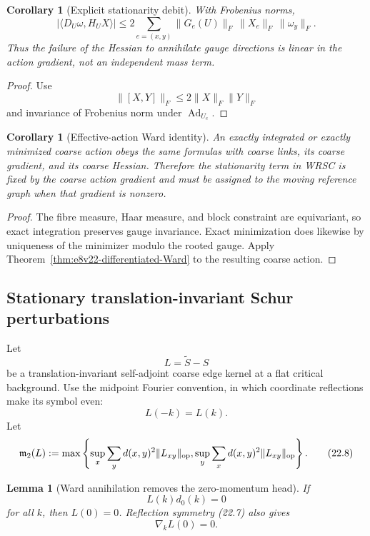 \documentclass[11pt,oneside]{book}
\newtheorem{lemma}[theorem]{Lemma}
\newtheorem{corollary}[theorem]{Corollary}
\theoremstyle{definition}
\theoremstyle{remark}
\begin{document}
\begin{corollary}[Explicit stationarity debit]
\label{cor:e8v22-stationarity}
With Frobenius norms,
\[
\left|
\langle D_U\omega,H_UX\rangle
\right|
\leq
2\sum_{e=(x,y)}
\|G_e(U)\|_F\,\|X_e\|_F\,\|\omega_y\|_F.            \tag{22.5}
\]
Thus the failure of the Hessian to annihilate gauge directions is
linear in the action gradient, not an independent mass term.
\end{corollary}

\begin{proof}
Use
\[
\|[X,Y]\|_F\leq2\|X\|_F\|Y\|_F
\]
and invariance of Frobenius norm under \(\operatorname{Ad}_{U_e}\).
\end{proof}

\begin{corollary}[Effective-action Ward identity]
\label{cor:e8v22-effective}
An exactly integrated or exactly minimized coarse action obeys the
same formulas with coarse links, its coarse gradient, and its coarse
Hessian.  Therefore the stationarity term in WRSC is fixed by the
coarse action gradient and must be assigned to the moving reference
graph when that gradient is nonzero.
\end{corollary}

\begin{proof}
The fibre measure, Haar measure, and block constraint are equivariant,
so exact integration preserves gauge invariance.  Exact minimization
does likewise by uniqueness of the minimizer modulo the rooted gauge.
Apply Theorem~\ref{thm:e8v22-differentiated-Ward} to the resulting
coarse action.
\end{proof}

\subsection{Stationary translation-invariant Schur perturbations}

Let
\[
                         L=\widetilde S-S                           \tag{22.6}
\]
be a translation-invariant self-adjoint coarse edge kernel at a flat
critical background.  Use the midpoint Fourier convention, in which
coordinate reflections make its symbol even:
\[
                         L(-k)=L(k).                               \tag{22.7}
\]
Let
\[
 \mathfrak m_2(L):=
\max\left\{
\sup_x\sum_y d(x,y)^2\|L_{xy}\|_{\rm op},
\sup_y\sum_x d(x,y)^2\|L_{xy}\|_{\rm op}
\right\}.                                                         \tag{22.8}
\]

\begin{lemma}[Ward annihilation removes the zero-momentum head]
\label{lem:e8v22-zero}
If
\[
                         L(k)d_0(k)=0                              \tag{22.9}
\]
for all \(k\), then \(L(0)=0\).  Reflection symmetry (22.7) also gives
\[
                         \nabla_kL(0)=0.                           \tag{22.10}
\]
\end{lemma}
\end{document}

